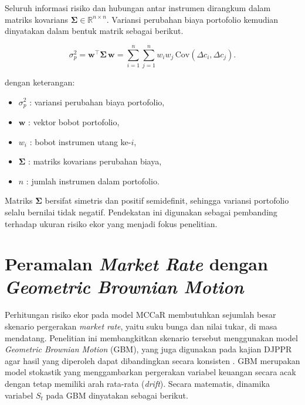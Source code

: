     Seluruh informasi risiko dan hubungan antar instrumen dirangkum dalam matriks kovarians $\boldsymbol{\Sigma} \in \mathbb{R}^{n\times n}$. Variansi perubahan biaya portofolio kemudian dinyatakan dalam bentuk matrik sebagai berikut.

    \begin{equation}
        \label{eq:varians-portofolio}
        \sigma_p^2 =\mathbf{w}^{\top}\boldsymbol{\Sigma}\,\mathbf{w}= \sum_{i=1}^{n}\sum_{j=1}^{n} w_i w_j\,\mathrm{Cov}(\Delta c_i, \Delta c_j).
    \end{equation}

    dengan keterangan:
    \begin{itemize}
        \item $\sigma_p^2$ : variansi perubahan biaya portofolio,
        \item $\mathbf{w}$ : vektor bobot portofolio,
        \item $w_i$ : bobot instrumen utang ke-$i$,
        \item $\boldsymbol{\Sigma}$ : matriks kovarians perubahan biaya,
        \item $n$ : jumlah instrumen dalam portofolio.
    \end{itemize}

    Matriks $\boldsymbol{\Sigma}$ bersifat simetris dan positif semidefinit, sehingga variansi portofolio selalu bernilai tidak negatif. Pendekatan ini digunakan sebagai pembanding terhadap ukuran risiko ekor yang menjadi fokus penelitian.


\section{Peramalan \textit{Market Rate} dengan \textit{Geometric Brownian Motion}} \label{sec:gbm}
Perhitungan risiko ekor pada model MCCaR membutuhkan sejumlah besar skenario pergerakan \textit{market rate}, yaitu suku bunga dan nilai tukar, di masa mendatang. Penelitian ini membangkitkan skenario tersebut menggunakan model \textit{Geometric Brownian Motion} (GBM), yang juga digunakan pada kajian DJPPR agar hasil yang diperoleh dapat dibandingkan secara konsisten . GBM merupakan model stokastik yang menggambarkan pergerakan variabel keuangan secara acak dengan tetap memiliki arah rata-rata (\textit{drift}). Secara matematis, dinamika variabel $S_t$ pada GBM dinyatakan sebagai berikut.

